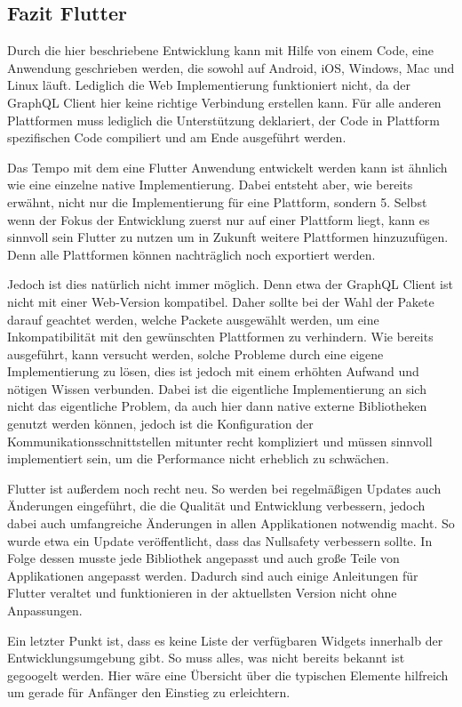\subsection{Fazit Flutter}
Durch die hier beschriebene Entwicklung kann mit Hilfe von einem Code, eine Anwendung geschrieben werden, die sowohl auf Android, iOS, Windows, Mac und Linux läuft. Lediglich die Web Implementierung funktioniert nicht, da der GraphQL Client hier keine richtige Verbindung erstellen kann. Für alle anderen Plattformen muss lediglich die Unterstützung deklariert, der Code in Plattform spezifischen Code compiliert und am Ende ausgeführt werden.

Das Tempo mit dem eine Flutter Anwendung entwickelt werden kann ist ähnlich wie eine einzelne native Implementierung. Dabei entsteht aber, wie bereits erwähnt, nicht nur die Implementierung für eine Plattform, sondern 5. Selbst wenn der Fokus der Entwicklung zuerst nur auf einer Plattform liegt, kann es sinnvoll sein Flutter zu nutzen um in Zukunft weitere Plattformen hinzuzufügen. Denn alle Plattformen können nachträglich noch exportiert werden.

Jedoch ist dies natürlich nicht immer möglich. Denn etwa der GraphQL Client ist nicht mit einer Web-Version kompatibel. Daher sollte bei der Wahl der Pakete darauf geachtet werden, welche Packete ausgewählt werden, um eine Inkompatibilität mit den gewünschten Plattformen zu verhindern. Wie bereits ausgeführt, kann versucht werden, solche Probleme durch eine eigene Implementierung zu lösen, dies ist jedoch mit einem erhöhten Aufwand und nötigen Wissen verbunden. Dabei ist die eigentliche Implementierung an sich nicht das eigentliche Problem, da auch hier dann native externe Bibliotheken genutzt werden können, jedoch ist die Konfiguration der Kommunikationsschnittstellen mitunter recht kompliziert und müssen sinnvoll implementiert sein, um die Performance nicht erheblich zu schwächen.

Flutter ist außerdem noch recht neu. So werden bei regelmäßigen Updates auch Änderungen eingeführt, die die Qualität und Entwicklung verbessern, jedoch dabei auch umfangreiche Änderungen in allen Applikationen notwendig macht. So wurde etwa ein Update veröffentlicht, dass das Nullsafety verbessern sollte. In Folge dessen musste jede Bibliothek angepasst und auch große Teile von Applikationen angepasst werden. Dadurch sind auch einige Anleitungen für Flutter veraltet und funktionieren in der aktuellsten Version nicht ohne Anpassungen.

Ein letzter Punkt ist, dass es keine Liste der verfügbaren Widgets innerhalb der Entwicklungsumgebung gibt. So muss alles, was nicht bereits bekannt ist gegoogelt werden. Hier wäre eine Übersicht über die typischen Elemente hilfreich um gerade für Anfänger den Einstieg zu erleichtern.